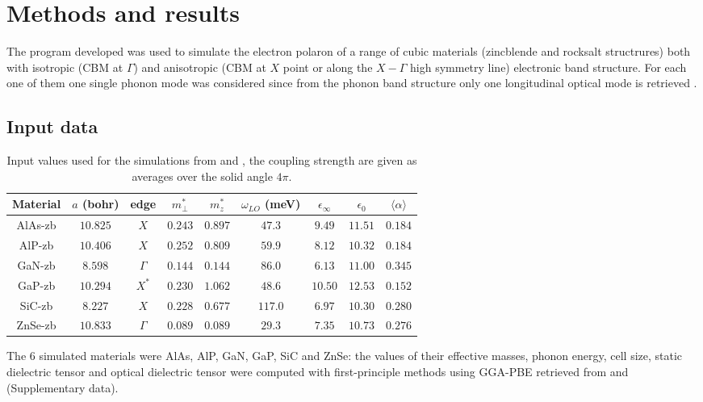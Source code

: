 \section{Methods and results}
The program developed was used to simulate the electron polaron of a range of cubic materials (zincblende and rocksalt structrures) both with 
isotropic (CBM at $\Gamma$) and anisotropic (CBM at $X$ point or along the $X-\Gamma$ high symmetry line) electronic band structure. For each one 
of them one single  phonon mode was considered since from the phonon band structure only one longitudinal optical mode is retrieved \cite{guster2021frohlich}.
\subsection{Input data}
\begin{table}[H]
    \centering
    \begin{tabular}{|c|c|c|c|c|c|c|c|c|}
        \hline
        \hline
        Material & $a$ (bohr) & edge & $m^*_\perp$ & $m^*_z$ & $\omega_{LO}$ (meV) & $\epsilon_\infty$ & $\epsilon_0$ & $\langle\alpha\rangle$\\
        \hline
        \hline
        AlAs-zb & $10.825$ & $X$ & $0.243$ & $0.897$ & $47.3$ & $9.49$ & $11.51$ & $0.184$ \\
        AlP-zb & $10.406$ & $X$ & $0.252$ & $0.809$ & $59.9$ & $8.12$ & $10.32$ & $0.184$ \\
        GaN-zb & $8.598$ & $\Gamma$ & $0.144$ & $0.144$ & $86.0$ & $6.13$ & $11.00$ & $0.345$ \\
        GaP-zb & $10.294$ & $X^*$ & $0.230$ & $1.062$ & $48.6$ & $10.50$ & $12.53$ & $0.152$ \\
        SiC-zb & $8.227$ & $X$ & $0.228$ & $0.677$ & $117.0$ & $6.97$ & $10.30$ & $0.280$ \\
        ZnSe-zb & $10.833$ & $\Gamma$ & $0.089$ & $0.089$ & $29.3$ & $7.35$ & $10.73$ & $0.276$ \\
        \hline        
    \end{tabular}
    \caption{Input values used for the simulations from \cite{miglio2020predominance} and \cite{guster2021frohlich}, the coupling strength are given as 
    averages over the solid angle $4\pi$.}
    \label{tab:inputs_params}
\end{table}
The 6 simulated materials were AlAs, AlP, GaN, GaP, SiC and ZnSe: the values of their effective masses, phonon energy, cell size, static dielectric tensor 
and optical dielectric tensor were computed with first-principle methods using GGA-PBE retrieved from \cite{miglio2020predominance} and \cite{guster2021frohlich} (Supplementary data). 

